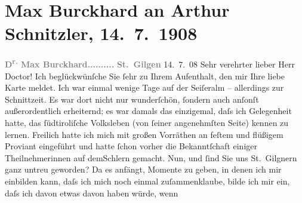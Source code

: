 

               \section[Max Burckhard an Arthur Schnitzler, 14. 7. 1908]{ Max Burckhard an Arthur Schnitzler, 14. 7. 1908}\nopagebreak{}\rehead{ }\begin{ledgroupsized}[t]{13cm}\normalsize\beginnumbering{} \toendnotes[C]{\smallbreak\pagebreak[2]} 
\toendnotes[C]{\smallbreak}\pstart
           \noindent{}{\pb}\textcolor{gray}{\textbf{D\textsuperscript{r.} Max Burckhard}}\hfill \textcolor{gray}{\textbf{..........}}\pend
           \pstart
           \raggedleft{}\textcolor{gray}{\textbf{St. Gilgen}}{ }14. 7. 08\pend
           \pstart{}Sehr verehrter lieber Herr Doctor!\pend\pstart
           Ich beglückwünſche Sie ſehr  zu Ihrem
                    Aufenthalt, den mir Ihre liebe Karte meldet. Ich war einmal wenige Tage auf der
                        Seiſeralm – allerdings zur Schnittzeit. Es
                    war dort nicht nur wunderſchön, ſondern auch anſonſt außerordentlich erheiternd;
                    es war damals das einzigemal, daſs ich Gelegenheit hatte, das ſüdtiroliſche Volksleben (von ſeiner angenehmſten Seite)
                    kennen zu lernen. Freilich hatte ich mich mit großen Vorräthen an feſtem und
                    flüßigem Proviant eingeführt und hatte ſchon vorher die Bekanntſchaft einiger
                    Theilnehmerinnen auf demSchlern gemacht.\pend
           \pstart
           {\pb}Nun, und ſind Sie uns St. Gilgnern ganz untreu geworden? Da es anfängt, Momente
                    zu geben, in denen ich mir einbilden kann, daſs ich mich noch einmal
                    zuſammenklaube, bilde ich mir ein, daſs ich davon etwas davon haben würde, wenn

\end{ledgroupsized}
